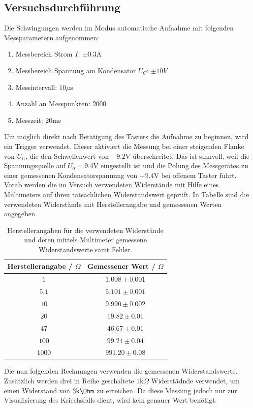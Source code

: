 \documentclass[a4paper, 12pt]{scrartcl}
\begin{document}
\subsection{Versuchsdurchführung}

Die Schwingungen werden im Modus \glqq automatische Aufnahme\grqq{} mit folgenden Messparametern aufgenommen:
\begin{enumerate}[-]
\item Messbereich Strom $I$: $\pm 0.3$A
\item Messbereich Spannung am Kondensator $U_C$: $\pm 10V$
\item Messintervall: $10\mu\text{s}$
\item Anzahl an Messpunkten: $2000$
\item Messzeit: $20$ms
\end{enumerate}
Um möglich direkt nach Betätigung des Tasters die Aufnahme zu beginnen, wird ein Trigger verwendet. Dieser aktiviert die Messung bei einer steigenden Flanke von $U_C$, die den Schwellenwert von $-9.2$V überschreitet. Das ist sinnvoll, weil die Spannungsquelle auf $U_0 = 9.4$V eingestellt ist und die Polung des Messgerätes zu einer gemessenen Kondensatorspannung von $-9.4$V bei offenem Taster führt. 
Vorab werden die im Versuch verwendeten Widerstände mit Hilfe eines Multimeters auf ihren tatsächlichen Widerstandswert geprüft. In Tabelle  sind die verwendeten Widerstände mit Herstellerangabe und gemessenen Werten angegeben.

\begin{table}[H]
\centering
\begin{tabular}{c|c}
Herstellerangabe / $\Omega$ & Gemessener Wert / $\Omega$ \\
\hline
$1$ & $1.008 \pm 0.001$ \\
$5.1$ & $5.101 \pm 0.001$ \\
$10$ & $9.990 \pm 0.002$ \\
$20$ & $19.82 \pm 0.01$ \\
$47$ & $46.67 \pm 0.01$ \\
$100$ & $99.24 \pm 0.04$ \\
$1000$ & $991.20\pm 0.08$
\end{tabular}
\caption{Herstellerangaben für die verwendeten Widerstände und deren mittels Multimeter gemessene Widerstandswerte samt Fehler.}
\label{tab:widerstaende}
\end{table}
Die nun folgenden Rechnungen verwenden die gemessenen Widerstandswerte. Zusätzlich werden drei in Reihe geschaltete $1\text{k}\Omega$ Widerstädnde verwendet, um einen Widerstand von $3\text{k}\Ohm$ zu erreichen. Da diese Messung jedoch nur zur Visualisierung des Kriechsfalls dient, wird kein genauer Wert benötigt. 
\end{document}
